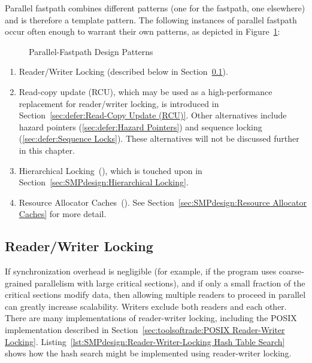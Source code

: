 Parallel fastpath combines different patterns (one for the
fastpath, one elsewhere) and is therefore a template pattern.
The following instances of parallel
fastpath occur often enough to warrant their own patterns,
as depicted in Figure~\ref{fig:SMPdesign:Parallel-Fastpath Design Patterns}:

\begin{figure}[tbp]
\centering
{}
\caption{Parallel-Fastpath Design Patterns}
\label{fig:SMPdesign:Parallel-Fastpath Design Patterns}
\end{figure}

\begin{enumerate}
\item	Reader/Writer Locking
	(described below in Section~\ref{sec:SMPdesign:Reader/Writer Locking}).
\item	Read-copy update (RCU), which may be used as a high-performance
	replacement for reader/writer locking, is introduced in
	Section~\ref{sec:defer:Read-Copy Update (RCU)}.
	Other alternatives include hazard pointers
	(\cref{sec:defer:Hazard Pointers})
	and sequence locking (\cref{sec:defer:Sequence Locks}).
	These alternatives will not be discussed further in this chapter.
\item   Hierarchical Locking~(\cite{McKenney95b}), which is touched upon
	in Section~\ref{sec:SMPdesign:Hierarchical Locking}.
\item	Resource Allocator Caches~(\cite{McKenney95b,McKenney93}).
	See Section~\ref{sec:SMPdesign:Resource Allocator Caches}
	for more detail.
\end{enumerate}

\subsection{Reader/Writer Locking}
\label{sec:SMPdesign:Reader/Writer Locking}

If synchronization overhead is negligible (for example, if the program
uses coarse-grained parallelism with large critical sections), and if
only a small fraction of the critical sections modify data, then allowing
multiple readers to proceed in parallel can greatly increase scalability.
Writers exclude both readers and each other.
There are many implementations of reader-writer locking, including
the POSIX implementation described in
Section~\ref{sec:toolsoftrade:POSIX Reader-Writer Locking}.
Listing~\ref{lst:SMPdesign:Reader-Writer-Locking Hash Table Search}
shows how the hash search might be implemented using reader-writer locking.

